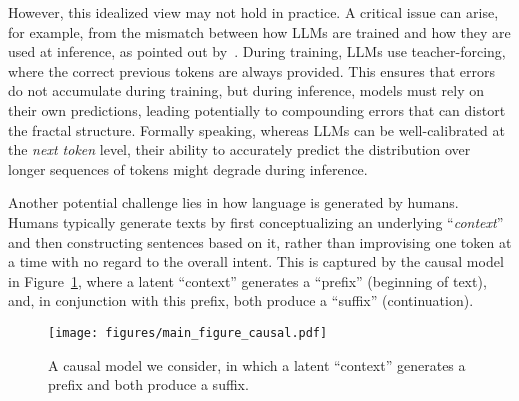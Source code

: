 However, this idealized view may not hold in practice. A critical issue can arise, for example, from the mismatch between how LLMs are trained and how they are used at inference, as pointed out by~\cite{bachmann2024pitfallsnexttokenprediction}. During training, LLMs use teacher-forcing, where the correct previous tokens are always provided. This ensures that errors do not accumulate during training, but during inference, models must rely on their own predictions, leading potentially to compounding errors that can distort the fractal structure. Formally speaking, whereas LLMs can be well-calibrated at the \emph{next token} level, their ability to accurately predict the distribution over longer sequences of tokens might degrade during inference.

Another potential challenge lies in how language is generated by humans. Humans typically generate texts by first conceptualizing an underlying ``\emph{context}'' and then constructing sentences based on it, rather than improvising one token at a time with no regard to the overall intent. This is captured by the causal model in Figure~\ref{fig:main_a}, where a latent ``context'' generates a ``prefix'' (beginning of text), and, in conjunction with this prefix, both produce a ``suffix'' (continuation).

\begin{figure}[t]
\centering
    \texttt{[image: figures/main\_figure\_causal.pdf]}
    \caption{A causal model we consider, in which a latent ``context'' generates a prefix and both produce a suffix.}\label{fig:main_a}
\end{figure}


